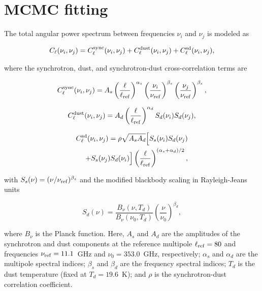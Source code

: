 \section{MCMC fitting}
\label{sec:mcmc}

The total angular power spectrum between frequencies $\nu_i$ and $\nu_j$ is modeled as

\begin{equation}
C_\ell(\nu_i, \nu_j) = C_\ell^{\rm sync}(\nu_i, \nu_j) + C_\ell^{\rm dust}(\nu_i, \nu_j) + C_\ell^{\rm sd}(\nu_i, \nu_j),
\end{equation}

where the synchrotron, dust, and synchrotron-dust cross-correlation terms are

\begin{equation}
C_\ell^{\rm sync}(\nu_i, \nu_j) = A_s \left(\frac{\ell}{\ell_{\rm ref}}\right)^{\alpha_s} 
\left(\frac{\nu_i}{\nu_{\rm ref}}\right)^{\beta_s} \left(\frac{\nu_j}{\nu_{\rm ref}}\right)^{\beta_s},
\end{equation}

\begin{equation}
C_\ell^{\rm dust}(\nu_i, \nu_j) = A_d \left(\frac{\ell}{\ell_{\rm ref}}\right)^{\alpha_d} 
S_d(\nu_i) S_d(\nu_j),
\end{equation}

\begin{equation}
\begin{split}
C_\ell^{\rm sd}(\nu_i, \nu_j) = \rho \sqrt{A_s A_d} \Big[ S_s(\nu_i) S_d(\nu_j) \\
+ S_s(\nu_j) S_d(\nu_i) \Big] \left(\frac{\ell}{\ell_{\rm ref}}\right)^{(\alpha_s + \alpha_d)/2},
\end{split}
\end{equation}

with $S_s(\nu) = (\nu / \nu_{\rm ref})^{\beta_s}$ and the modified blackbody scaling in Rayleigh-Jeans units

\begin{equation}
S_d(\nu) = \frac{B_\nu(\nu, T_d)}{B_\nu(\nu_0, T_d)} \left(\frac{\nu}{\nu_0}\right)^{\beta_d},
\end{equation}

where $B_\nu$ is the Planck function. Here, $A_s$ and $A_d$ are the amplitudes of the synchrotron and dust components at the reference multipole $\ell_{\rm ref} = 80$ and frequencies $\nu_{\rm ref} = 11.1$~GHz and $\nu_0 = 353.0$~GHz, respectively; $\alpha_s$ and $\alpha_d$ are the multipole spectral indices; $\beta_s$ and $\beta_d$ are the frequency spectral indices; $T_d$ is the dust temperature (fixed at $T_d = 19.6$~K); and $\rho$ is the synchrotron-dust correlation coefficient.

